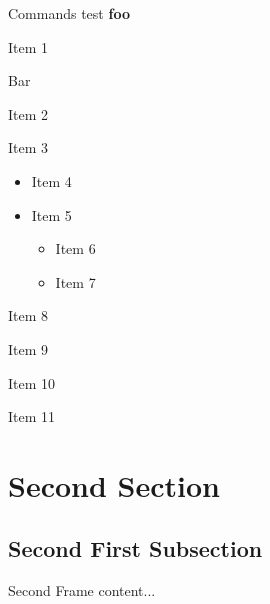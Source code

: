 \documentclass[aspectratio=169]{beamer}
\begin{document}
\begin{frame}{Commands test}
	\textbf{foo}
	\begin{vfilleditems}
		\item Item 1
		\item \alert{Bar}
	\end{vfilleditems}
	\begin{fixedvfilleditems}
		\item Item 2
		\item Item 3
		\begin{itemize}
			\item Item 4
			\item Item 5
			\begin{itemize}
				\item Item 6
				\item Item 7
			\end{itemize}
		\end{itemize}
		\item Item 8
		\item Item 9
		\item Item 10
		\item Item 11
	\end{fixedvfilleditems}
\end{frame}


\section{Second Section}

\subsection{Second First Subsection}

\begin{frame}{Second Frame}
	content...
\end{frame}
\end{document}
